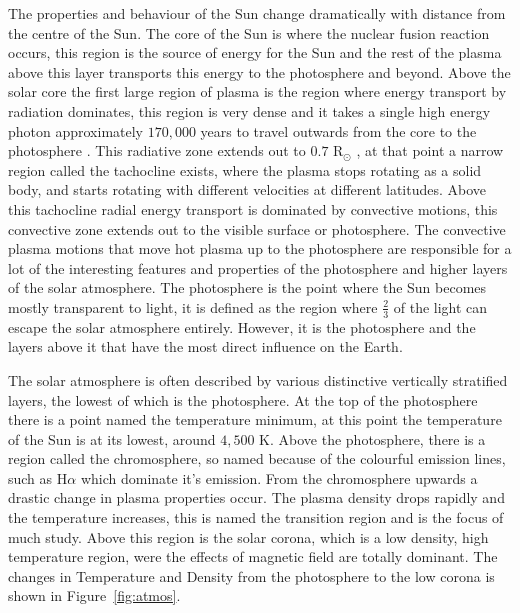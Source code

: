 The properties and behaviour of the Sun change dramatically with distance from the centre of the Sun.
The core of the Sun is where the nuclear fusion reaction occurs, this region is the source of energy for the Sun and the rest of the plasma above this layer transports this energy to the photosphere and beyond.
Above the solar core the first large region of plasma is the region where energy transport by radiation dominates, this region is very dense and it takes a single high energy photon approximately $170,000$ years to travel outwards from the core to the photosphere \citep{priest2014}.
This radiative zone extends out to $0.7$ R$_\odot$ \citep{priest2014}, at that point a narrow region called the tachocline exists, where the plasma stops rotating as a solid body, and starts rotating with different velocities at different latitudes.
Above this tachocline radial energy transport is dominated by convective motions, this convective zone extends out to the visible surface or photosphere.
The convective plasma motions that move hot plasma up to the photosphere are responsible for a lot of the interesting features and properties of the photosphere and higher layers of the solar atmosphere.
The photosphere is the point where the Sun becomes mostly transparent to light, it is defined as the region where $\frac{2}{3}$ of the light can escape the solar atmosphere entirely.
However, it is the photosphere and the layers above it that have the most direct influence on the Earth.

The solar atmosphere is often described by various distinctive vertically stratified layers, the lowest of which is the photosphere.
At the top of the photosphere there is a point named the temperature minimum, at this point the temperature of the Sun is at its lowest, around $4,500$ K.
Above the photosphere, there is a region called the chromosphere, so named because of the colourful emission lines, such as H$\alpha$ which dominate it's emission.
From the chromosphere upwards a drastic change in plasma properties occur.
The plasma density drops rapidly and the temperature increases, this is named the transition region and is the focus of much study.
Above this region is the solar corona, which is a low density, high temperature region, were the effects of magnetic field are totally dominant.
The changes in Temperature and Density from the photosphere to the low corona is shown in Figure~\ref{fig:atmos}.

